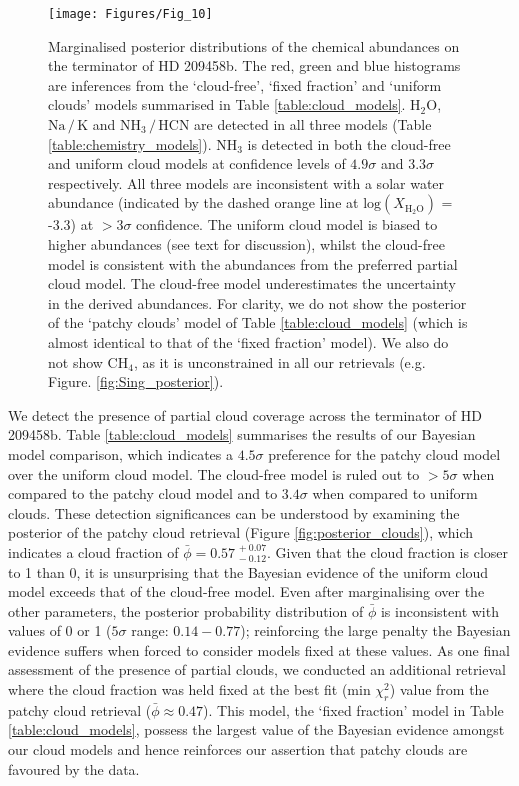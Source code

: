\documentclass[fleqn,usenatbib]{mnras}
\begin{document}
\begin{figure*}
	\texttt{[image: Figures/Fig\_10]}
    \caption{Marginalised posterior distributions of the chemical abundances on the terminator of HD 209458b. The red, green and blue histograms are inferences from the `cloud-free', `fixed fraction' and `uniform clouds' models summarised in Table \ref{table:cloud_models}. $\mathrm{H_{2}O}$, $\mathrm{Na \, / \, K}$ and $\mathrm{NH_3 \, / \, HCN}$ are detected in all three models (Table \ref{table:chemistry_models}). $\mathrm{NH_3}$ is detected in both the cloud-free and uniform cloud models at confidence levels of $4.9\sigma$ and $3.3\sigma$ respectively. All three models are inconsistent with a solar water abundance (indicated by the dashed orange line at $\mathrm{log}(X_{\mathrm{H_{2}O}})$ = -3.3) at $>3\sigma$ confidence. The uniform cloud model is biased to higher abundances (see text for discussion), whilst the cloud-free model is consistent with the abundances from the preferred partial cloud model. The cloud-free model underestimates the uncertainty in the derived abundances. For clarity, we do not show the posterior of the `patchy clouds' model of Table \ref{table:cloud_models} (which is almost identical to that of the `fixed fraction' model). We also do not show $\mathrm{CH_4}$, as it is unconstrained in all our retrievals (e.g. Figure. \ref{fig:Sing_posterior}).}
    \label{fig:results_chemistry}
\end{figure*}

We detect the presence of partial cloud coverage across the terminator of HD 209458b. Table \ref{table:cloud_models} summarises the results of our Bayesian model comparison, which indicates a $4.5\sigma$ preference for the patchy cloud model over the uniform cloud model. The cloud-free model is ruled out to $>5\sigma$ when compared to the patchy cloud model and to $3.4\sigma$ when compared to uniform clouds. These detection significances can be understood by examining the posterior of the patchy cloud retrieval (Figure \ref{fig:posterior_clouds}), which indicates a cloud fraction of $\bar{\phi} = 0.57^{\, +0.07}_{\, -0.12}$. Given that the cloud fraction is closer to 1 than 0, it is unsurprising that the Bayesian evidence of the uniform cloud model exceeds that of the cloud-free model. Even after marginalising over the other parameters, the posterior probability distribution of $\bar{\phi}$ is inconsistent with values of 0 or 1 ($5\sigma$ range: $0.14-0.77$); reinforcing the large penalty the Bayesian evidence suffers when forced to consider models fixed at these values. As one final assessment of the presence of partial clouds, we conducted an additional retrieval where the cloud fraction was held fixed at the best fit (min $\chi_{r}^{2}$) value from the patchy cloud retrieval ($\bar{\phi} \approx 0.47$). This model, the `fixed fraction' model in Table \ref{table:cloud_models}, possess the largest value of the Bayesian evidence amongst our cloud models and hence reinforces our assertion that patchy clouds are favoured by the data.
\end{document}

